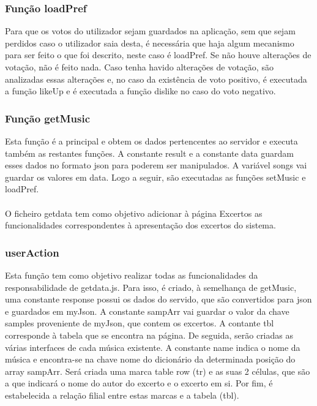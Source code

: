 \documentclass{report}
\begin{document}
\subsubsection{Função loadPref}
\hspace{5pt}Para que os votos do utilizador sejam guardados na aplicação, sem que sejam perdidos caso o 
utilizador saia desta, é necessária que haja algum mecanismo para ser feito o que foi descrito, neste 
caso é loadPref. Se não houve alterações de votação, não é feito nada. Caso tenha havido alterações de 
votação, são analizadas essas alterações e, no caso da existência de voto positivo, é executada a função 
likeUp e é executada a função dislike no caso do voto negativo.

\subsubsection{Função getMusic}
\hspace{5pt}Esta função é a principal e obtem os dados pertencentes ao servidor e executa também as 
restantes funções. A constante result e a constante data guardam esses dados no formato \ac{json} para 
poderem ser manipulados. A variável songs vai guardar os valores em data. Logo a seguir, são executadas 
as funções setMusic e loadPref.

\paragraph{}

\hspace{5pt}O ficheiro getdata tem como objetivo adicionar à página Excertos as funcionalidades 
correspondentes à apresentação dos excertos do sistema.

\subsubsection{userAction}
\hspace{5pt}Esta função tem como objetivo realizar todas as funcionalidades da responsabilidade de 
getdata.js. Para isso, é criado, à semelhança de getMusic, uma constante response possui os dados 
do servido, que são convertidos para \ac{json} e guardados em myJson. A constante sampArr vai 
guardar o valor da chave samples proveniente de myJson, que contem os excertos. A contante tbl 
corresponde à tabela que se encontra na página. De seguida, serão criadas as várias interfaces de cada 
música existente. A constante name indica o nome da música e encontra-se na chave nome do dicionário da 
determinada posição do array sampArr. Será criada uma marca table row (tr) e as suas 2 células, que são a 
que indicará o nome do autor do excerto e o excerto em si. Por fim, é estabelecida a relação filial entre 
estas marcas e a tabela (tbl).
\end{document}
